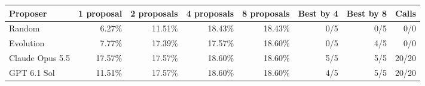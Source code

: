 \begin{tabular}{lrrrrrrr}
\toprule
Proposer & 1 proposal & 2 proposals & 4 proposals & 8 proposals & Best by 4 & Best by 8 & Calls \\
\midrule
Random & 6.27\% & 11.51\% & 18.43\% & 18.43\% & 0/5 & 0/5 & 0/0 \\
Evolution & 7.77\% & 17.39\% & 17.57\% & 18.60\% & 0/5 & 4/5 & 0/0 \\
Claude Opus 5.5 & 17.57\% & 17.57\% & 18.60\% & 18.60\% & 5/5 & 5/5 & 20/20 \\
GPT 6.1 Sol & 11.51\% & 17.57\% & 18.60\% & 18.60\% & 4/5 & 5/5 & 20/20 \\
\bottomrule
\end{tabular}
